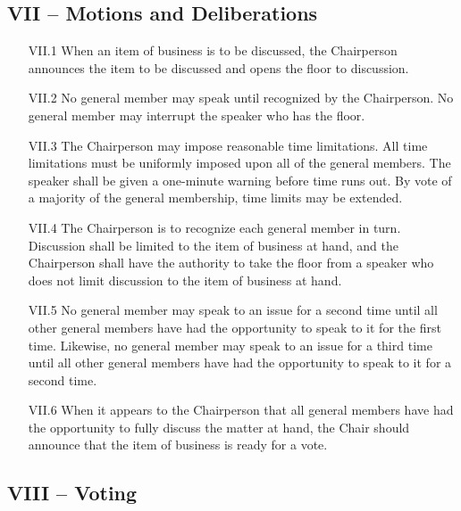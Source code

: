 \documentclass[12pt,a4paper]{article}
\begin{document}
\subsection*{VII – Motions and Deliberations}

\begin{enumerate}
\item[VII.1] When an item of business is to be discussed, the Chairperson announces the item to be discussed and opens the floor to discussion.

\item[VII.2] No general member may speak until recognized by the Chairperson. No general member may interrupt the speaker who has the floor.

\item[VII.3] The Chairperson may impose reasonable time limitations. All time limitations must be uniformly imposed upon all of the general members. The speaker shall be given a one-minute warning before time runs out. By vote of a majority of the general membership, time limits may be extended.

\item[VII.4] The Chairperson is to recognize each general member in turn. Discussion shall be limited to the item of business at hand, and the Chairperson shall have the authority to take the floor from a speaker who does not limit discussion to the item of business at hand.

\item[VII.5] No general member may speak to an issue for a second time until all other general members have had the opportunity to speak to it for the first time. Likewise, no general member may speak to an issue for a third time until all other general members have had the opportunity to speak to it for a second time.

\item[VII.6] When it appears to the Chairperson that all general members have had the opportunity to fully discuss the matter at hand, the Chair should announce that the item of business is ready for a vote.
\end{enumerate}

\subsection*{VIII – Voting}
\end{document}

